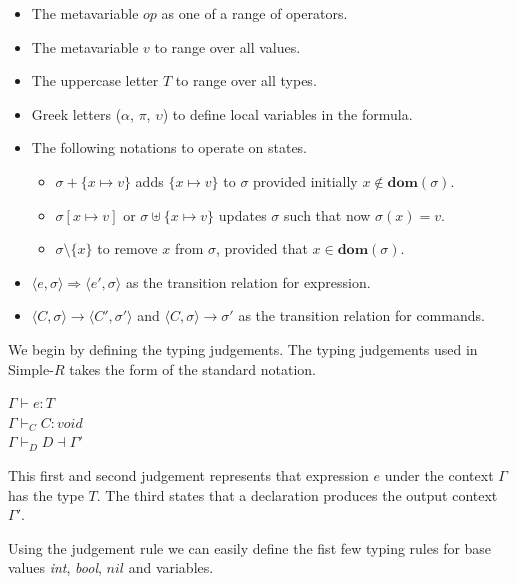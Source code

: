 \documentclass[a4paper,12pt]{report}
\begin{document}
\renewcommand\labelitemii{$\blacksquare$}
\begin{itemize}
  \item The metavariable $op$ as one of a range of operators. 
  \item The metavariable $v$ to range over all values.
  \item The uppercase letter $T$ to range over all types.
  \item Greek letters ($\alpha$, $\pi$, $\upsilon$) to define local variables in 
  the formula. 
  \item The following notations to operate on states. 
    \begin{itemize}
      \item $\sigma + \{x \mapsto v\}$ adds $\{x \mapsto v\}$ to $\sigma$ provided initially $x \notin\textbf{dom}(\sigma)$. 
      \item $\sigma[x \mapsto v]$ or $\sigma \uplus \{x \mapsto v\}$ updates $\sigma$ such that now $\sigma(x) = v$.
      \item $\sigma \setminus \{x\}$ to remove $x$ from $\sigma$, provided that $x \in \textbf{dom}(\sigma)$.
    \end{itemize}
  \item $\langle e, \sigma \rangle \Longrightarrow \langle e', \sigma \rangle$ as the transition relation for expression.
  \item $\langle C, \sigma \rangle \longrightarrow \langle C', \sigma' \rangle$ and $\langle C, \sigma \rangle \longrightarrow \sigma'$ as the transition relation for commands.
\end{itemize}

\par
We begin by defining the typing judgements. The typing judgements used in 
Simple-$R$ takes the form of the standard notation. 
\begin{center}
  $\Gamma \vdash e : T$\\
  $\Gamma \vdash_{C} C : void$\\
  $\Gamma \vdash_{D} D \dashv \Gamma'$\\
\end{center}
This first and second judgement represents that expression $e$ 
under the context $\Gamma$ has the type $T$. The third states that a declaration 
produces the output context $\Gamma'$.

\par
Using the judgement rule we can easily define the fist few typing rules for base 
values \textit{int}, \textit{bool}, $nil$ and variables.
\end{document}
